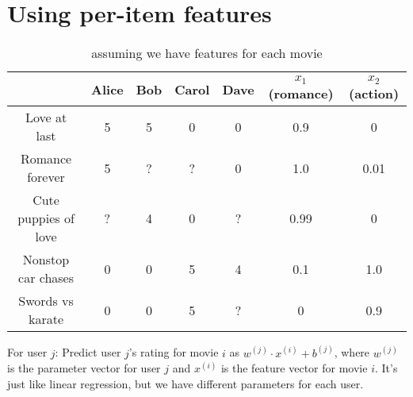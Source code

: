 \section{Using per-item features}
\begin{table}[H]
    \centering
    \begin{tabular}{ccccccc}
        \toprule
        & Alice & Bob & Carol & Dave & $x_1$(romance) & $x_2$(action)\\
        \midrule
        Love at last & 5 & 5 & 0 & 0 & 0.9 & 0 \\
        Romance forever & 5 & ? & ? & 0 & 1.0 & 0.01 \\
        Cute puppies of love & ? & 4 & 0 & ? & 0.99 & 0 \\
        Nonstop car chases & 0 & 0 & 5 & 4 & 0.1 & 1.0 \\
        Swords vs karate & 0 & 0 & 5 & ? & 0 & 0.9 \\
        \bottomrule
    \end{tabular}
    \caption{assuming we have features for each movie}
\end{table}

For user $j$: Predict user $j$'s rating for movie $i$ as $w^{(j)} \cdot x^{(i)} + b^{(j)}$,
where $w^{(j)}$ is the parameter vector for user $j$ and $x^{(i)}$ is the feature vector for movie $i$.
It's just like linear regression, but we have different parameters for each user.

